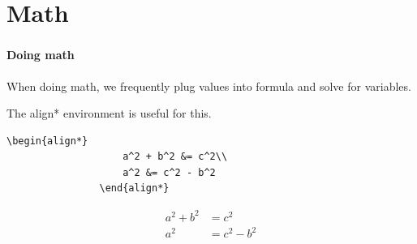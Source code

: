 \documentclass{beamer}
\begin{document}
	\section{Math}
	\begin{frame}[fragile]
		\frametitle{\secname}
		\framesubtitle{Doing math}
		When doing math, we frequently plug values into formula and solve for variables.

		The \alert{align*} environment is useful for this.
		\begin{example}
			\begin{lstlisting}[numbers=none, gobble=16]
				\begin{align*}
					a^2 + b^2 &= c^2\\
					a^2 &= c^2 - b^2
				\end{align*}
			\end{lstlisting}
		\end{example}
		\Large
		\begin{align*}
			a^2 + b^2 &= c^2\\
			a^2 &= c^2 - b^2
		\end{align*}
	\end{frame}
\end{document}
